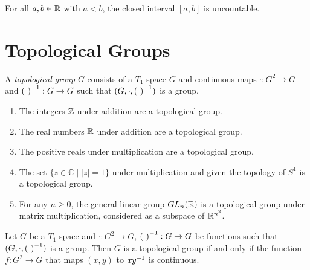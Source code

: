 \begin{corollary}
    \label{corollary:closed_interval_uncountable}
    For all $a, b \in \mathbb{R}$ with $a < b$, the closed interval $[a,b]$
    is uncountable.
\end{corollary}

\chapter{Topological Groups}

\begin{definition}
    A \emph{topological group} $G$ consists of a $T_1$ space $G$ and continuous maps
    $\cdot : G^2 \rightarrow G$ and ${(\ )}^{-1} : G \rightarrow G$ such that $(G, \cdot, \inv{(\ )})$
    is a group.
\end{definition}

\begin{example}
    \begin{enumerate}
        \item The integers $\mathbb{Z}$ under addition are a topological group.
        \item The real numbers $\mathbb{R}$ under addition are a topological group.
        \item The positive reals under multiplication are a topological group.
        \item The set $\{ z \in \mathbb{C} \mid |z| = 1 \}$ under multiplication
        and given the topology of $S^1$ is a topological group.
        \item For any $n \geq 0$, the general linear group $GL_n(\mathbb{R})$ is a topological
        group under matrix multiplication, considered as a subspace of $\mathbb{R}^{n^2}$.
    \end{enumerate}
\end{example}

\begin{lemma}
    Let $G$ be a $T_1$ space and $\cdot : G^2 \rightarrow G$, ${(\ )}^{-1} : G \rightarrow G$
    be functions such that $(G, \cdot, \inv{(\ )})$ is a group. Then $G$ is a
    topological group if and only if the function $f : G^2 \rightarrow G$ that maps
    $(x,y)$ to $x {y}^{-1}$ is continuous.
\end{lemma}

